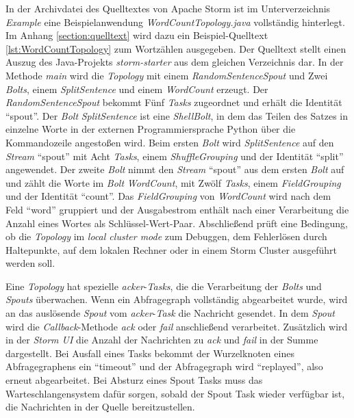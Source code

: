 In der Archivdatei des Quelltextes von Apache Storm  ist im Unterverzeichnis \textit{Example} eine Beispielanwendung \textit{\textit{WordCountTopology.java}} vollständig hinterlegt. Im Anhang \ref{section:quelltext} wird dazu ein Beispiel-Quelltext \ref{lst:WordCountTopology} zum Wortzählen ausgegeben. Der Quelltext stellt einen Auszug des Java-Projekts \textit{storm-starter} aus dem gleichen Verzeichnis dar. In der Methode \textit{main} wird die \textit{Topology} mit einem \textit{RandomSentenceSpout} und Zwei \textit{Bolts}, einem \textit{SplitSentence} und einem \textit{WordCount} erzeugt. Der \textit{RandomSentenceSpout} bekommt Fünf \textit{Tasks} zugeordnet und erhält die Identität "`spout"'. Der \textit{Bolt} \textit{SplitSentence} ist eine \textit{ShellBolt}, in dem das Teilen des Satzes in einzelne Worte in der externen Programmiersprache Python über die Kommandozeile angestoßen wird. Beim ersten \textit{Bolt} wird \textit{SplitSentence} auf den \textit{Stream} "`spout"' mit Acht \textit{Tasks}, einem \textit{ShuffleGrouping} und der Identität "`split"' angewendet. Der zweite \textit{Bolt} nimmt den \textit{Stream} "`spout"' aus dem ersten \textit{Bolt} auf und zählt die Worte im \textit{Bolt} \textit{WordCount}, mit Zwölf \textit{Tasks}, einem \textit{FieldGrouping} und der Identität "`count"'. Das \textit{FieldGrouping} von \textit{WordCount} wird nach dem Feld "`word"' gruppiert und der Ausgabestrom enthält nach einer Verarbeitung die Anzahl eines Wortes als Schlüssel-Wert-Paar. Abschließend prüft eine Bedingung, ob die \textit{Topology} im \textit{local cluster mode} zum Debuggen, dem Fehlerlösen durch Haltepunkte, auf dem lokalen Rechner oder in einem Storm Cluster ausgeführt werden soll.

Eine \textit{Topology} hat spezielle \textit{acker}-\textit{Tasks}, die die Verarbeitung der \textit{Bolts} und \textit{Spouts} überwachen. Wenn ein Abfragegraph vollständig abgearbeitet wurde, wird an das auslösende \textit{Spout} vom \textit{acker}-\textit{Task} die Nachricht gesendet. In dem \textit{Spout} wird die \textit{Callback}-Methode \textit{ack} oder \textit{fail} anschließend verarbeitet. Zusätzlich wird in der \textit{Storm UI} die Anzahl der Nachrichten zu \textit{ack} und \textit{fail} in der Summe dargestellt. Bei Ausfall eines Tasks bekommt der Wurzelknoten eines Abfragegraphens ein "`timeout"' und der Abfragegraph wird "`replayed"', also erneut abgearbeitet. Bei Absturz eines Spout Tasks muss das Warteschlangensystem dafür sorgen, sobald der Spout Task wieder verfügbar ist, die Nachrichten in der Quelle bereitzustellen. 

